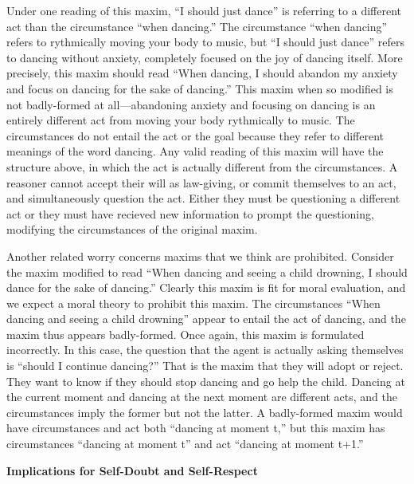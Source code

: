 \begin{isabellebody}
\begin{isamarkuptext}
Under one reading of this maxim, ``I should just dance'' is referring to a different act than the 
circumstance ``when dancing.'' The circumstance ``when dancing'' refers 
to rythmically moving your body to music, but ``I should just dance'' refers to dancing without anxiety, 
completely focused on the joy of dancing itself. More precisely, this maxim should read ``When 
dancing, I should abandon my anxiety and focus on dancing for the sake of dancing.'' This maxim when so 
modified is not badly-formed at all—abandoning anxiety and focusing on dancing is an entirely different act 
from moving your body rythmically to music. The circumstances do not entail the act or the goal because 
they refer to different meanings of the word dancing. Any valid reading of this maxim will have the structure above, 
in which the act is actually different from the circumstances. A reasoner cannot accept their will 
as law-giving, or commit themselves to an act, and simultaneously question the act. Either they must be 
questioning a different act or they must have recieved new information to prompt the questioning, 
modifying the circumstances of the original maxim. 

Another related worry concerns maxims that we think are prohibited. Consider the maxim modified to 
read ``When dancing and seeing a child drowning, I should dance for the sake of dancing.'' Clearly this 
maxim is fit for moral evaluation, and we expect a moral theory to prohibit this maxim. The circumstances 
``When dancing and seeing a child drowning'' appear to entail the act of dancing, and the maxim thus 
appears badly-formed. Once again, this maxim is formulated incorrectly. In this case, the question 
that the agent is actually asking themselves is ``should I continue dancing?'' That is the 
maxim that they will adopt or reject. They want to know if they should stop dancing and go help the child. 
Dancing at the current moment and dancing at the next moment are different acts, and the circumstances 
imply the former but not the latter. A badly-formed maxim would have circumstances and act both 
``dancing at moment t,'' but this maxim has circumstances ``dancing at moment t'' and act ``dancing 
at moment t+1.''

\noindent \textbf{Implications for Self-Doubt and Self-Respect}


\end{isamarkuptext}
\end{isabellebody}
